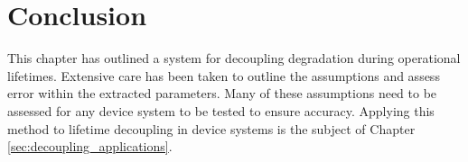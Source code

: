\documentclass[../thesis.tex]{subfiles}
\begin{document}
\section{Conclusion}
This chapter has outlined a system for decoupling degradation during operational lifetimes.
Extensive care has been taken to outline the assumptions and assess error within the extracted parameters.  
Many of these assumptions need to be assessed for any device system to be tested to ensure accuracy.  
Applying this method to lifetime decoupling in device systems is the subject of Chapter \ref{sec:decoupling_applications}.



\end{document}
